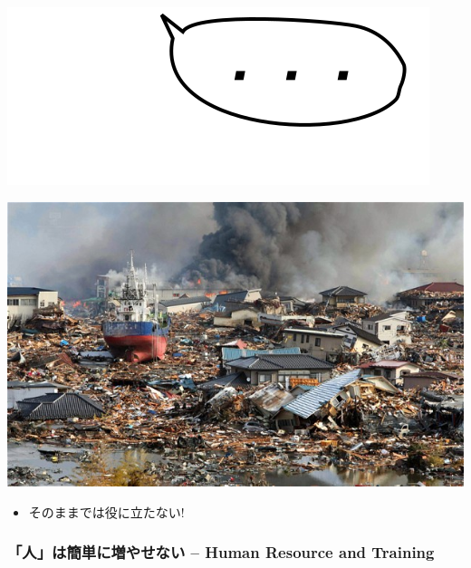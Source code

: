 \begin{container-fluid}
\begin{row-fluid}
\begin{span2}
\includegraphics{img/silent.png}
\end{span2}
\begin{span10}
\includegraphics{img/static/tsunami.jpg}
\end{span10}
\end{row-fluid}
\end{container-fluid}

\begin{larger}
\begin{alignright}
\begin{itemize}
\item そのままでは役に立たない!
\end{itemize}
\end{alignright}
\end{larger}

\subsubsection{「人」は簡単に増やせない -- Human Resource and Training}
\label{sec:orgheadline9}

